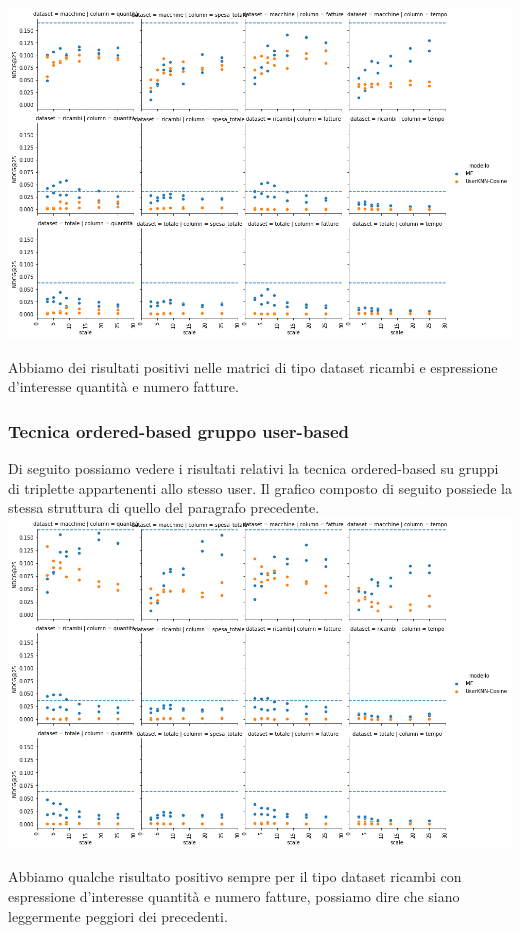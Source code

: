 \includegraphics[width=16cm]{figures/risultati_ordered_globale.png}

Abbiamo dei risultati positivi nelle matrici di tipo dataset ricambi e espressione d'interesse quantità e numero fatture.\\

\subsubsection{Tecnica ordered-based gruppo user-based}
Di seguito possiamo vedere i risultati relativi la tecnica ordered-based su gruppi di triplette appartenenti allo stesso user.
Il grafico composto di seguito possiede la stessa struttura di quello del paragrafo precedente.\\

\includegraphics[width=16cm]{figures/risultati_ordered_singolo.png}

Abbiamo qualche risultato positivo sempre per il tipo dataset ricambi con espressione d'interesse quantità e numero fatture, possiamo dire che siano leggermente peggiori dei precedenti.
\newpage

